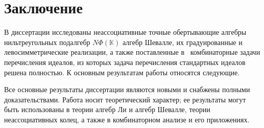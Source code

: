 \chapter*{Заключение}

В диссертации исследованы неассоциативные точные обертывающие алгебры
нильтреугольных подалгебр $N\Phi(\mathbb{K})$ алгебр Шевалле, их градуированные
и левосимметрические реализации, а также поставленные в~\cite{sigsam2001}
комбинаторные задачи перечисления идеалов, из которых задача перечисления
стандартных идеалов решена полностью. К основным результатам работы относятся
следующие.



Все основные результаты диссертации являются новыми и снабжены полными
доказательствами. Работа носит теоретический характер; ее результаты могут быть
использованы в теории алгебр Ли и алгебр Шевалле, теории неассоциативных колец,
а также в комбинаторном анализе и его приложениях.
